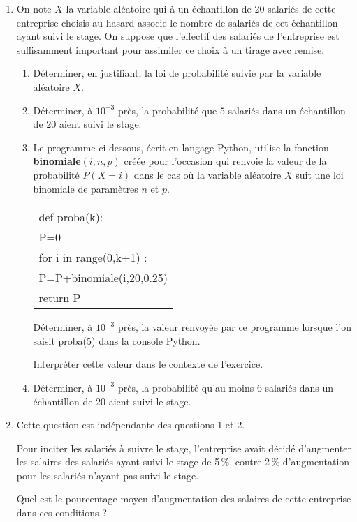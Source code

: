 \documentclass[11pt,a4paper,french]{article}
\begin{document}
\begin{enumerate}[resume]
\item On note $X$ la variable aléatoire qui à un échantillon de $20$ salariés de cette entreprise choisis au hasard associe le nombre de salariés de cet échantillon ayant suivi le stage. On suppose que l'effectif des salariés de l'entreprise est suffisamment important pour assimiler ce choix à un tirage avec  remise.
	\begin{enumerate}
		\item Déterminer, en justifiant, la loi de probabilité suivie par la variable aléatoire $X$.
		\item Déterminer, à $10^{-3}$ près, la probabilité que $5$ salariés dans un échantillon de $20$ aient suivi le stage.
		\item Le programme ci-dessous, écrit en langage Python, utilise la fonction \textbf{binomiale$(i, n, p)$} créée pour l'occasion qui renvoie
la valeur de la probabilité $P(X = i)$ dans le cas où la variable aléatoire $X$ suit une loi binomiale de paramètres $n$ et $p$.

\begin{center}
\begin{tabular}{|l|}\hline
def proba(k):\\
\quad  P=0\\
\quad for i in range(0,k+1) :\\
\qquad P=P+binomiale(i,20,0.25)\\
\quad return P\\ \hline
\end{tabular}
\end{center}

Déterminer, à $10^{-3}$ près, la valeur renvoyée par ce programme lorsque l'on saisit proba(5) dans la console Python. 

Interpréter cette valeur dans le contexte de l'exercice.
		\item Déterminer, à $10^{-3}$ près, la probabilité qu'au moins $6$ salariés dans un échantillon de $20$ aient suivi le stage.
		\end{enumerate}	
\item Cette question est indépendante des questions 1 et 2.

Pour inciter les salariés à suivre le stage, l'entreprise avait décidé d'augmenter les salaires des salariés ayant suivi le stage de 5\,\%, contre 2\,\% d'augmentation pour les salariés n'ayant pas suivi le stage. 

Quel est le pourcentage moyen d'augmentation des salaires de cette entreprise dans ces conditions ?

\end{enumerate}
\end{document}
